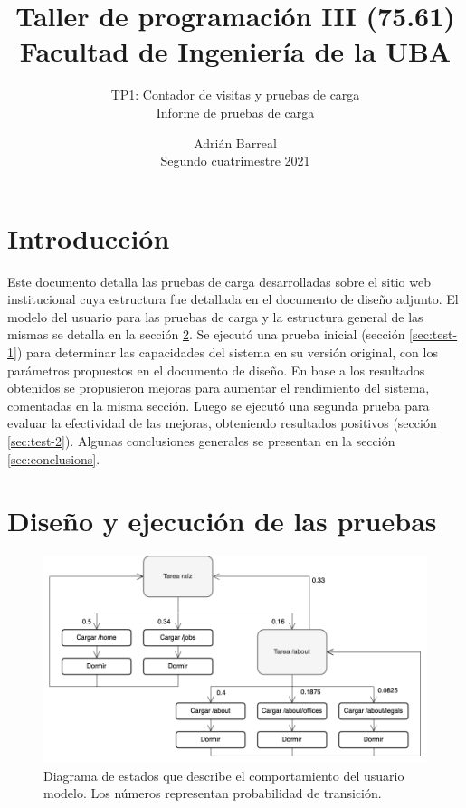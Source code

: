 \documentclass[11pt]{scrartcl}
\title{Taller de programación III (75.61)\\[0.2em]\Large{Facultad de Ingeniería de la UBA}\\[1em]}
\subtitle{\huge{TP1: Contador de visitas y pruebas de carga\\[0.2em]Informe de pruebas de carga}}
\author{Adrián Barreal\\\small{Segundo cuatrimestre 2021}}
\date{}
\begin{document}
\maketitle
\tableofcontents
\newpage

\section{Introducción}

Este documento detalla las pruebas de carga desarrolladas sobre el sitio web institucional cuya estructura fue detallada en el documento de diseño adjunto.
El modelo del usuario para las pruebas de carga y la estructura general de las mismas se detalla en la sección \ref{sec:design}. Se ejecutó una prueba inicial (sección \ref{sec:test-1}) para determinar las capacidades del sistema en su versión original, con los parámetros propuestos en el documento de diseño. En base a los resultados obtenidos se propusieron mejoras para aumentar el rendimiento del sistema, comentadas en la misma sección. Luego se ejecutó una segunda prueba para evaluar la efectividad de las mejoras, obteniendo resultados positivos (sección \ref{sec:test-2}). Algunas conclusiones generales se presentan en la sección \ref{sec:conclusions}.

\section{Diseño y ejecución de las pruebas}\label{sec:design}

\begin{figure}
\centering
\includegraphics[scale=0.44]{img/user}
\caption{Diagrama de estados que describe el comportamiento del usuario modelo. Los números representan probabilidad de transición.}
\label{fig:user-state}
\end{figure}
\end{document}
